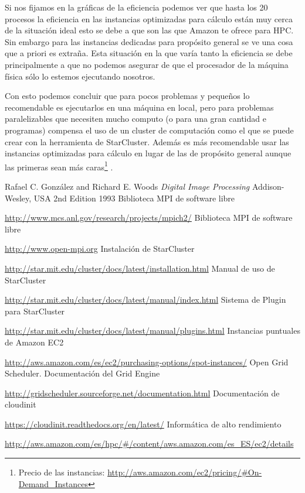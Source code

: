 \documentclass{article}
\begin{document}
	Si nos fijamos en la gráficas de la eficiencia podemos ver que hasta los 20 procesos la eficiencia en las instancias optimizadas para cálculo están muy cerca de la situación ideal esto se debe a que son las que Amazon te ofrece para HPC\cite{AmazonHPC}. Sin embargo para las instancias dedicadas para propósito general se ve una cosa que a priori es extraña. Esta situación en la que varía tanto la eficiencia se debe principalmente a que no podemos asegurar de que el procesador de la máquina física sólo lo estemos ejecutando nosotros.
	
	Con esto podemos concluir que para pocos problemas y pequeños lo recomendable es ejecutarlos en una máquina en local, pero para problemas paralelizables que necesiten mucho computo (o para una gran cantidad e programas) compensa el uso de un cluster de computación como el que se puede crear con la herramienta de StarCluster. Además es más recomendable usar las instancias optimizadas para cálculo en lugar de las de propósito general aunque las primeras sean más caras\footnote{Precio de las instancias: \url{http://aws.amazon.com/ec2/pricing/\#On-Demand\_Instances}} .

\clearpage
{\setlength{\parskip}{0mm} \listoftables } %
{\setlength{\parskip}{0mm} \listoffigures} %

\clearpage

\renewcommand{\bibname}{Referencias}
\begin{thebibliography}{99}
Rafael C. González and Richard E. Woods
\emph{Digital Image Processing}
Addison-Wesley, USA
2nd Edition
1993
Biblioteca MPI de software libre

\url{http://www.mcs.anl.gov/research/projects/mpich2/}
Biblioteca MPI de software libre

\url{http://www.open-mpi.org}
Instalación de StarCluster

\url{http://star.mit.edu/cluster/docs/latest/installation.html}
Manual de uso de StarCluster

\url{http://star.mit.edu/cluster/docs/latest/manual/index.html}
Sistema de Plugin para StarCluster

\url{http://star.mit.edu/cluster/docs/latest/manual/plugins.html}
Instancias puntuales de Amazon EC2

\url{http://aws.amazon.com/es/ec2/purchasing-options/spot-instances/}
Open Grid Scheduler. Documentación del Grid Engine

\url{http://gridscheduler.sourceforge.net/documentation.html}
Documentación de cloudinit

\url{https://cloudinit.readthedocs.org/en/latest/}
Informática de alto rendimiento

\url{http://aws.amazon.com/es/hpc/#/content/aws.amazon.com/es_ES/ec2/details}
\end{thebibliography}
\end{document}
